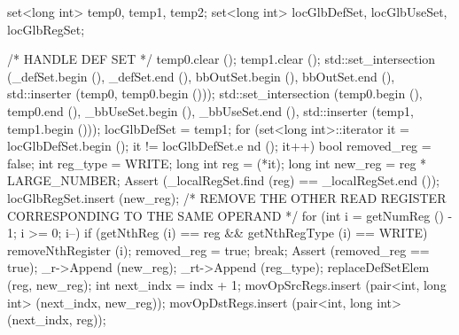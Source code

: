 \begin{DoxyCode}
                                                                                 
                                                                    {
    set<long int> temp0, temp1, temp2;
    set<long int> locGlbDefSet, locGlbUseSet, locGlbRegSet;

    /* HANDLE DEF SET */
    temp0.clear ();
    temp1.clear ();
    std::set_intersection (_defSet.begin (), _defSet.end (),
                           bbOutSet.begin (), bbOutSet.end (),
                           std::inserter (temp0, temp0.begin ()));
    std::set_intersection (temp0.begin (), temp0.end (),
                           _bbUseSet.begin (), _bbUseSet.end (), 
                           std::inserter (temp1, temp1.begin ()));
    locGlbDefSet = temp1;
    for (set<long int>::iterator it = locGlbDefSet.begin (); it != locGlbDefSet.e
      nd (); it++) {
        bool removed_reg = false;
        int reg_type = WRITE;
        long int reg = (*it);
        long int new_reg = reg * LARGE_NUMBER;
        Assert (_localRegSet.find (reg) == _localRegSet.end ());
        locGlbRegSet.insert (new_reg);
        /* REMOVE THE OTHER READ REGISTER CORRESPONDING TO THE SAME OPERAND */
        for (int i = getNumReg () - 1; i >= 0; i--) {
            if (getNthReg (i) == reg && getNthRegType (i) == WRITE) {
                removeNthRegister (i);
                removed_reg = true;
                break;
            }
        }
        Assert (removed_reg == true);
        _r->Append (new_reg);
        _rt->Append (reg_type);
        replaceDefSetElem (reg, new_reg);
        int next_indx = indx + 1;
        movOpSrcRegs.insert (pair<int, long int> (next_indx, new_reg));
        movOpDstRegs.insert (pair<int, long int> (next_indx, reg));
    }

}
\end{DoxyCode}
